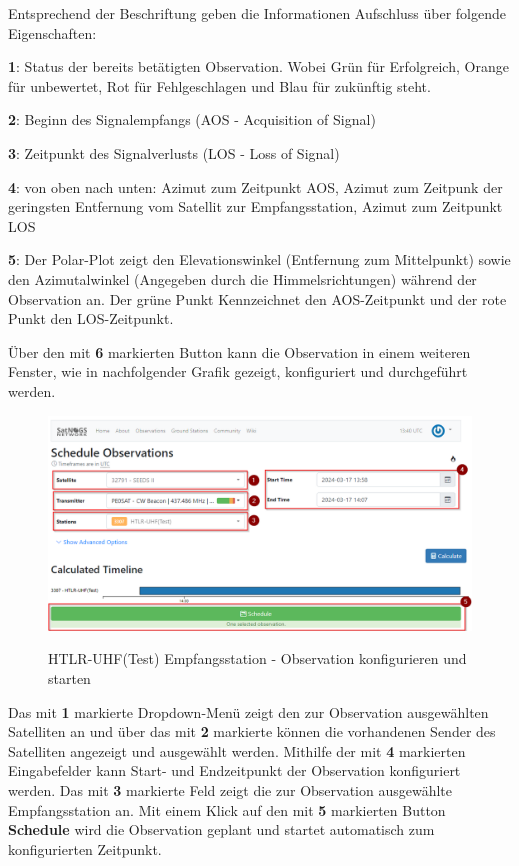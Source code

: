 Entsprechend der Beschriftung geben die Informationen Aufschluss über folgende Eigenschaften:

\textbf{1}: Status der bereits betätigten Observation. Wobei Grün für Erfolgreich, Orange für unbewertet, Rot für Fehlgeschlagen und Blau für zukünftig steht.\newline

\textbf{2}: Beginn des Signalempfangs (AOS - Acquisition of Signal) \newline

\textbf{3}: Zeitpunkt des Signalverlusts (LOS - Loss of Signal) \newline

\textbf{4}: von oben nach unten: Azimut zum Zeitpunkt AOS, Azimut zum Zeitpunk der geringsten Entfernung vom Satellit zur Empfangsstation, Azimut zum Zeitpunkt LOS \newline

\textbf{5}: Der Polar-Plot zeigt den Elevationswinkel (Entfernung zum Mittelpunkt) sowie den Azimutalwinkel (Angegeben durch die Himmelsrichtungen) während der Observation an. Der grüne Punkt Kennzeichnet den AOS-Zeitpunkt und der rote Punkt den LOS-Zeitpunkt.

Über den mit \textbf{6} markierten Button kann die Observation in einem weiteren Fenster, wie in nachfolgender Grafik gezeigt, konfiguriert und durchgeführt werden.

\begin{figure} [H]
	\centering
	\includegraphics[width=\linewidth]{../ref/schedule_observation_schedule.png}
	\caption{HTLR-UHF(Test) Empfangsstation - Observation konfigurieren und starten} \cite{noauthor_satnogs_nodate}
	\label{fig:htrl-uhf(test)configureobservation}
\end{figure}

Das mit \textbf{1} markierte Dropdown-Menü zeigt den zur Observation ausgewählten Satelliten an und über das mit \textbf{2} markierte können die vorhandenen Sender des Satelliten angezeigt und ausgewählt werden. Mithilfe der mit \textbf{4} markierten Eingabefelder kann Start- und Endzeitpunkt der Observation konfiguriert werden. Das mit \textbf{3} markierte Feld zeigt die zur Observation ausgewählte Empfangsstation an. Mit einem Klick auf den mit \textbf{5} markierten Button \textbf{Schedule} wird die Observation geplant und startet automatisch zum konfigurierten Zeitpunkt.

